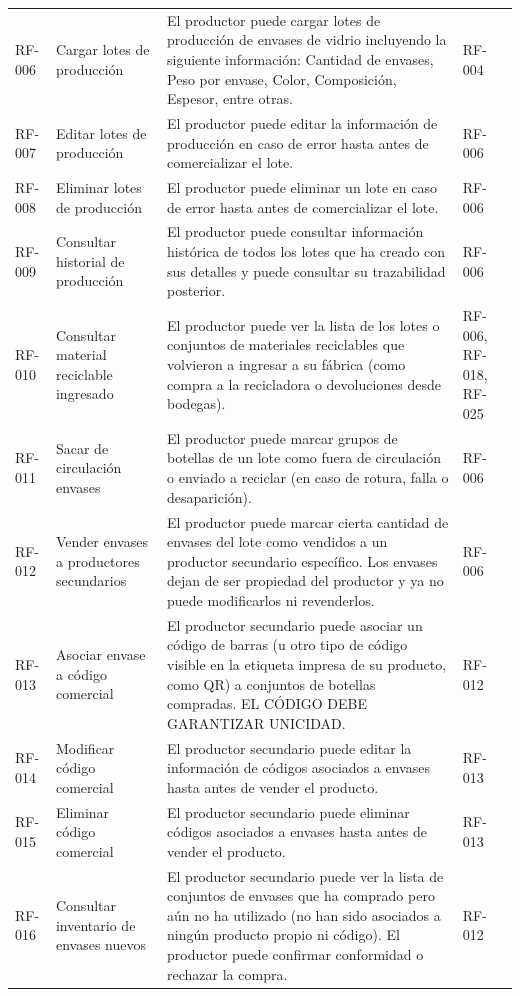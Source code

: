 \begin{xltabular}{\textwidth}{@{} L{1.5cm} L{2.5cm} Y L{1.5cm} @{}}
	RF-006 & Cargar lotes de producción & El productor puede cargar lotes de producción de envases de vidrio incluyendo la siguiente información: Cantidad de envases, Peso por envase, Color, Composición, Espesor, entre otras. & RF-004 \\
	RF-007 & Editar lotes de producción & El productor puede editar la información de producción en caso de error hasta antes de comercializar el lote. & RF-006 \\
	RF-008 & Eliminar lotes de producción & El productor puede eliminar un lote en caso de error hasta antes de comercializar el lote. & RF-006 \\
	RF-009 & Consultar historial de producción & El productor puede consultar información histórica de todos los lotes que ha creado con sus detalles y puede consultar su trazabilidad posterior. & RF-006 \\
	RF-010 & Consultar material reciclable ingresado & El productor puede ver la lista de los lotes o conjuntos de materiales reciclables que volvieron a ingresar a su fábrica (como compra a la recicladora o devoluciones desde bodegas). & RF-006, RF-018, RF-025 \\
	RF-011 & Sacar de circulación envases & El productor puede marcar grupos de botellas de un lote como fuera de circulación o enviado a reciclar (en caso de rotura, falla o desaparición). & RF-006 \\
	RF-012 & Vender envases a productores secundarios & El productor puede marcar cierta cantidad de envases del lote como vendidos a un productor secundario específico. Los envases dejan de ser propiedad del productor y ya no puede modificarlos ni revenderlos. & RF-006 \\
	RF-013 & Asociar envase a código comercial & El productor secundario puede asociar un código de barras (u otro tipo de código visible en la etiqueta impresa de su producto, como QR) a conjuntos de botellas compradas. EL CÓDIGO DEBE GARANTIZAR UNICIDAD. & RF-012 \\
	RF-014 & Modificar código comercial & El productor secundario puede editar la información de códigos asociados a envases hasta antes de vender el producto. & RF-013 \\
	RF-015 & Eliminar código comercial & El productor secundario puede eliminar códigos asociados a envases hasta antes de vender el producto. & RF-013 \\
	RF-016 & Consultar inventario de envases nuevos & El productor secundario puede ver la lista de conjuntos de envases que ha comprado pero aún no ha utilizado (no han sido asociados a ningún producto propio ni código). El productor puede confirmar conformidad o rechazar la compra. & RF-012 \\

\end{xltabular}
